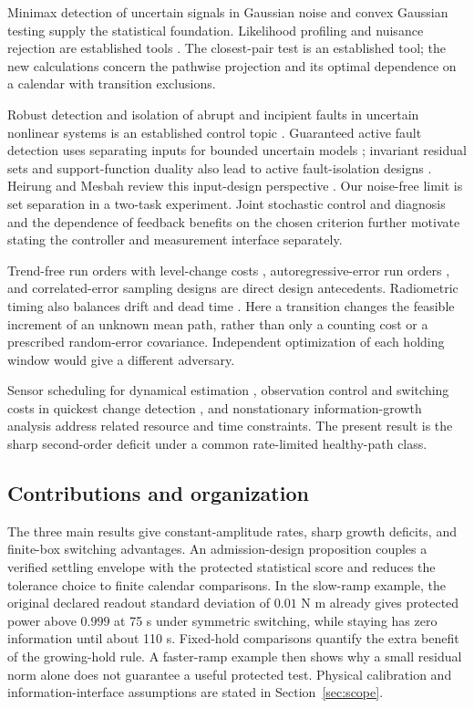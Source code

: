 Minimax detection of uncertain signals in Gaussian noise \cite{burnashev} and convex Gaussian testing \cite{gjn} supply the statistical foundation. Likelihood profiling and nuisance rejection are established tools \cite{basseville}. The closest-pair test is an established tool; the new calculations concern the pathwise projection and its optimal dependence on a calendar with transition exclusions.

Robust detection and isolation of abrupt and incipient faults in uncertain nonlinear systems is an established control topic \cite{zhang2002}. Guaranteed active fault detection uses separating inputs for bounded uncertain models \cite{nik98,campbell,scott}; invariant residual sets and support-function duality also lead to active fault-isolation designs \cite{blanchini}. Heirung and Mesbah review this input-design perspective \cite{heirung}. Our noise-free limit is set separation in a two-task experiment. Joint stochastic control and diagnosis \cite{simandl} and the dependence of feedback benefits on the chosen criterion \cite{ashari} further motivate stating the controller and measurement interface separately.

Trend-free run orders with level-change costs \cite{coster}, autoregressive-error run orders \cite{cheng}, and correlated-error sampling designs \cite{bickel1,bickel2} are direct design antecedents. Radiometric timing also balances drift and dead time \cite{schieder,ossenkopf}. Here a transition changes the feasible increment of an unknown mean path, rather than only a counting cost or a prescribed random-error covariance. Independent optimization of each holding window would give a different adversary.

Sensor scheduling for dynamical estimation \cite{vitus,zhao}, observation control and switching costs in quickest change detection \cite{banerjee,lautay,lubenia}, and nonstationary information-growth analysis \cite{liang,hou} address related resource and time constraints. The present result is the sharp second-order deficit under a common rate-limited healthy-path class.

\subsection{Contributions and organization}
The three main results give constant-amplitude rates, sharp growth deficits, and finite-box switching advantages. An admission-design proposition couples a verified settling envelope with the protected statistical score and reduces the tolerance choice to finite calendar comparisons. In the slow-ramp example, the original declared readout standard deviation of $0.01$ N m already gives protected power above $0.999$ at 75 s under symmetric switching, while staying has zero information until about 110 s. Fixed-hold comparisons quantify the extra benefit of the growing-hold rule. A faster-ramp example then shows why a small residual norm alone does not guarantee a useful protected test. Physical calibration and information-interface assumptions are stated in Section~\ref{sec:scope}.
